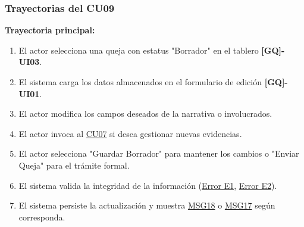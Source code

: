 \begin{appendices}
\subsubsection{Trayectorias del CU09}
\textbf{Trayectoria principal:}
\begin{enumerate}[nosep]
    \item El actor selecciona una queja con estatus "Borrador" en el tablero \textbf{[GQ]-UI03}.
    \item El sistema carga los datos almacenados en el formulario de edición \textbf{[GQ]-UI01}.
    \item El actor modifica los campos deseados de la narrativa o involucrados.
    \item El actor invoca al \hyperlink{anexo:casos_uso}{CU07} si desea gestionar nuevas evidencias.
    \item El actor selecciona "Guardar Borrador" para mantener los cambios o "Enviar Queja" para el trámite formal.
    \item El sistema valida la integridad de la información (\hyperlink{err:E10}{Error E1}, \hyperlink{err:E11}{Error E2}).
    \item El sistema persiste la actualización y muestra \hyperlink{msg:MSG18}{MSG18} o \hyperlink{msg:MSG17}{MSG17} según corresponda.
\end{enumerate}


\end{appendices}
